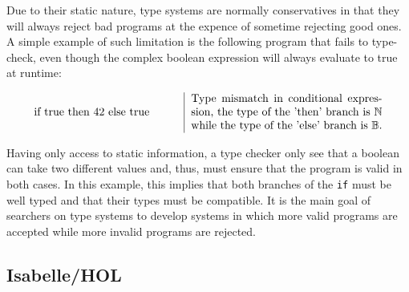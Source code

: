 
Due to their static nature, type systems are normally conservatives in that they will always reject
bad programs at the expence of sometime rejecting good ones. A simple example of such limitation is
the following program that fails to type-check, even though the complex boolean expression will
always evaluate to true at runtime:

\begin{displaymath}
  \begin{tabular}{m{4.5cm} | m{6cm}}
    if true then 42 else true
    & Type mismatch in conditional expression, the type of the 'then' branch is $\mathbb{N}$ while
    the type of the 'else' branch is $\mathbb{B}$.
  \end{tabular}
\end{displaymath}

Having only access to static information, a type checker only see that a boolean can take two
different values and, thus, must ensure that the program is valid in both cases. In this example,
this implies that both branches of the \texttt{if} must be well typed and that their types must be
compatible. It is the main goal of searchers on type systems to develop systems in which more valid
programs are accepted while more invalid programs are rejected.

\subsection{Isabelle/HOL}


